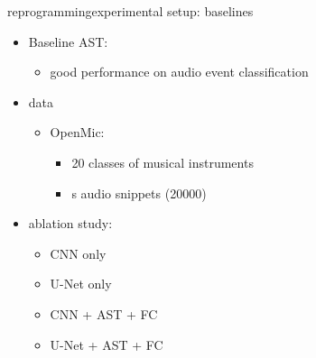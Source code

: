 \begin{frame}{reprogramming}{experimental setup: baselines}
    \vspace{-3mm}
    \begin{itemize}
        \item Baseline AST:
            \begin{itemize}
                \item   good performance on audio event classification
            \end{itemize}
        \bigskip
        \item data
            \begin{itemize}
                \item   OpenMic:
                    \begin{itemize}
                        \item   20 classes of musical instruments
                        \item   \unit[10]{s} audio snippets (20000)
                    \end{itemize}
            \end{itemize}
        \bigskip
        \item   ablation study:
            \begin{itemize}
                \item   CNN only
                \item   U-Net only
                \item   CNN + AST + FC
                \item   U-Net + AST + FC
            \end{itemize}
    \end{itemize}
\end{frame}

